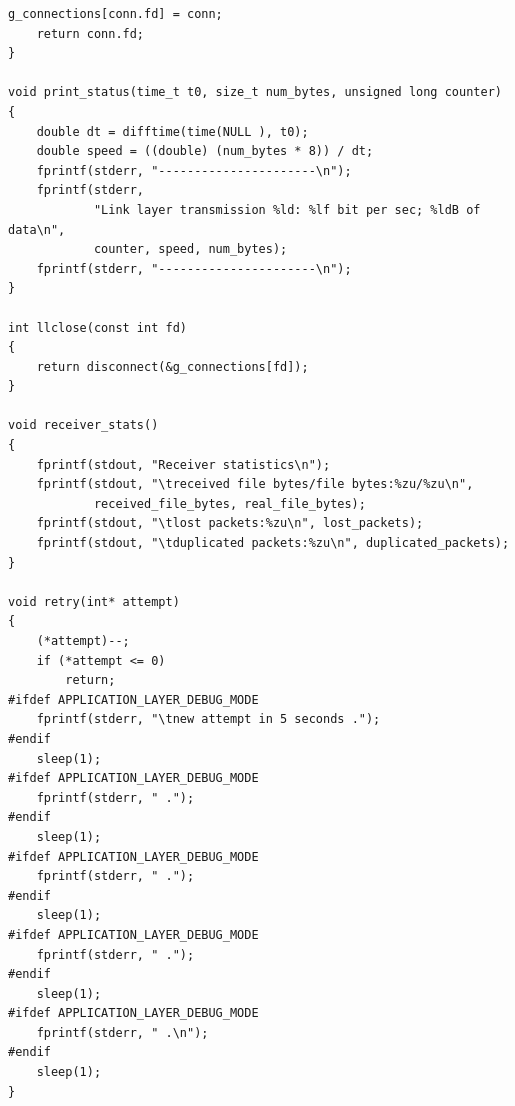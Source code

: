 \documentclass[a4paper,11pt,titlepage]{article}
\begin{document}
\begin{lstlisting}[style=customcwithlines]
	g_connections[conn.fd] = conn;
	return conn.fd;
}

void print_status(time_t t0, size_t num_bytes, unsigned long counter)
{
	double dt = difftime(time(NULL ), t0);
	double speed = ((double) (num_bytes * 8)) / dt;
	fprintf(stderr, "----------------------\n");
	fprintf(stderr,
			"Link layer transmission %ld: %lf bit per sec; %ldB of data\n",
			counter, speed, num_bytes);
	fprintf(stderr, "----------------------\n");
}

int llclose(const int fd)
{
	return disconnect(&g_connections[fd]);
}

void receiver_stats()
{
	fprintf(stdout, "Receiver statistics\n");
	fprintf(stdout, "\treceived file bytes/file bytes:%zu/%zu\n",
			received_file_bytes, real_file_bytes);
	fprintf(stdout, "\tlost packets:%zu\n", lost_packets);
	fprintf(stdout, "\tduplicated packets:%zu\n", duplicated_packets);
}

void retry(int* attempt)
{
	(*attempt)--;
	if (*attempt <= 0)
		return;
#ifdef APPLICATION_LAYER_DEBUG_MODE
	fprintf(stderr, "\tnew attempt in 5 seconds .");
#endif
	sleep(1);
#ifdef APPLICATION_LAYER_DEBUG_MODE
	fprintf(stderr, " .");
#endif
	sleep(1);
#ifdef APPLICATION_LAYER_DEBUG_MODE
	fprintf(stderr, " .");
#endif
	sleep(1);
#ifdef APPLICATION_LAYER_DEBUG_MODE
	fprintf(stderr, " .");
#endif
	sleep(1);
#ifdef APPLICATION_LAYER_DEBUG_MODE
	fprintf(stderr, " .\n");
#endif
	sleep(1);
}
\end{lstlisting}
\end{document}
